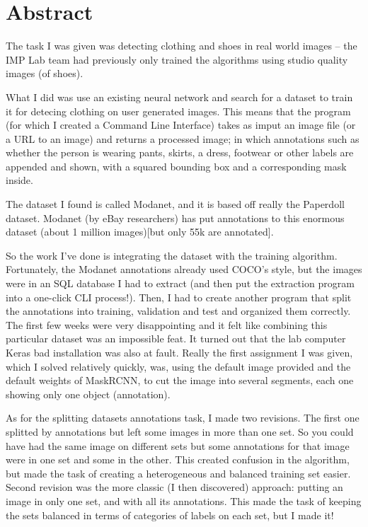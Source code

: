 \chapter*{Abstract}

The task I was given was detecting clothing and shoes in real world images -- the IMP Lab team had previously only trained the algorithms using studio quality images (of shoes).

What I did was use an existing neural network and search for a dataset to train it for detecing clothing on user generated images. This means that the program (for which I created a Command Line Interface) takes as imput an image file (or a URL to an image) and returns a processed image; in which annotations such as whether the person is wearing pants, skirts, a dress, footwear or other labels are appended and shown, with a squared bounding box and a corresponding mask inside.

The dataset I found is called Modanet, and it is based off really the Paperdoll dataset. Modanet (by eBay researchers) has put annotations to this enormous dataset (about 1 million images)[but only 55k are annotated].

So the work I've done is integrating the dataset with the training algorithm. Fortunately, the Modanet annotations already used COCO's style, but the images were in an SQL database I had to extract (and then put the extraction program into a one-click CLI process!).
Then, I had to create another program that split the annotations into training, validation and test and organized them correctly. The first few weeks were very disappointing and it felt like combining this particular dataset was an impossible feat. It turned out that the lab computer Keras bad installation was also at fault.
Really the first assignment I was given, which I solved relatively quickly, was, using the default image provided and the default weights of MaskRCNN, to cut the image into several segments, each one showing only one object (annotation).

As for the splitting datasets annotations task, I made two revisions. The first one splitted by annotations but left some images in more than one set. So you could have had the same image on different sets but some annotations for that image were in one set and some in the other. This created confusion in the algorithm, but made the task of creating a heterogeneous and balanced training set easier. Second revision was the more classic (I then discovered) approach: putting an image in only one set, and with all its annotations. This made the task of keeping the sets balanced in terms of categories of labels on each set, but I made it!

